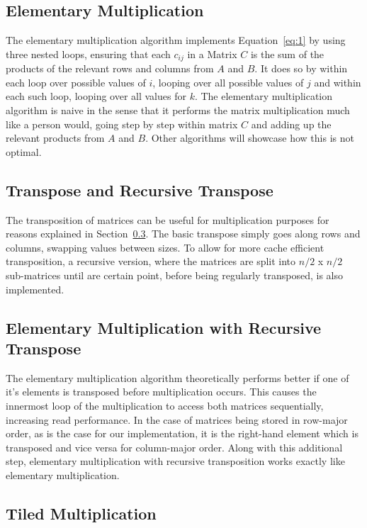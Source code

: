 \documentclass[12pt, a4paper]{article}
\begin{document}
\subsection{Elementary Multiplication}
\label{sec:elem_mult}
The elementary multiplication algorithm implements Equation~\ref{eq:1} by using three nested loops, ensuring that each $c_{ij}$ in a Matrix $C$ is the sum of the products of the relevant rows and columns from $A$ and $B$. It does so by within each loop over possible values of $i$, looping over all possible values of $j$ and within each such loop, looping over all values for $k$. The elementary multiplication algorithm is naive in the sense that it performs the matrix multiplication much like a person would, going step by step within matrix $C$ and adding up the relevant products from $A$ and $B$. Other algorithms will showcase how this is not optimal.

\subsection{Transpose and Recursive Transpose}
The transposition of matrices can be useful for multiplication purposes for reasons explained in Section~\ref{sec:transpose}. The basic transpose simply goes along rows and columns, swapping values between sizes. To allow for more cache efficient transposition, a recursive version, where the matrices are split into $n/2$ x $n/2$ sub-matrices until are certain point, before being regularly transposed, is also implemented.

\subsection{Elementary Multiplication with Recursive Transpose}
\label{sec:transpose}
The elementary multiplication algorithm theoretically performs better if one of it's elements is transposed before multiplication occurs. This causes the innermost loop of the multiplication to access both matrices sequentially, increasing read performance. In the case of matrices being stored in row-major order, as is the case for our implementation, it is the right-hand element which is transposed and vice versa for column-major order. Along with this additional step, elementary multiplication with recursive transposition works exactly like elementary multiplication.

\subsection{Tiled Multiplication}
\end{document}
